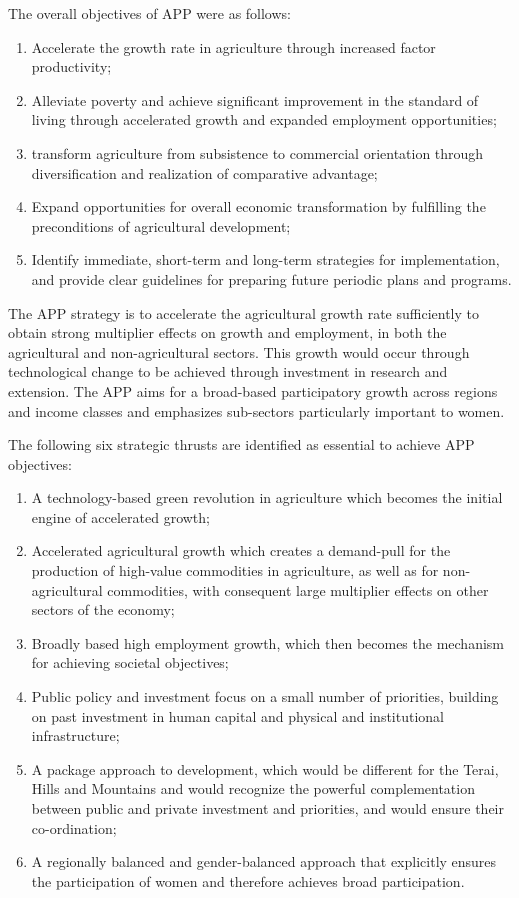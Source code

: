 \documentclass[
  openany]{book}
\providecommand{\tightlist}{%
  \setlength{\itemsep}{0pt}\setlength{\parskip}{0pt}}
\begin{document}
The overall objectives of APP were as follows:

\begin{enumerate}
\def\labelenumi{\arabic{enumi}.}
\item
  Accelerate the growth rate in agriculture through increased factor productivity;
\item
  Alleviate poverty and achieve significant improvement in the standard of living through accelerated growth and expanded employment opportunities;
\item
  transform agriculture from subsistence to commercial orientation through diversification and realization of comparative advantage;
\item
  Expand opportunities for overall economic transformation by fulfilling the preconditions of agricultural development;
\item
  Identify immediate, short-term and long-term strategies for implementation, and provide clear guidelines for preparing future periodic plans and programs.
\end{enumerate}

The APP strategy is to accelerate the agricultural growth rate sufficiently to obtain strong multiplier effects on growth and employment, in both the agricultural and non-agricultural sectors. This growth would occur through technological change to be achieved through investment in research and extension. The APP aims for a broad-based participatory growth across regions and income classes and emphasizes sub-sectors particularly important to women.

The following six strategic thrusts are identified as essential to achieve APP objectives:

\begin{enumerate}
\def\labelenumi{\arabic{enumi}.}
\tightlist
\item
  A technology-based green revolution in agriculture which becomes the initial engine of accelerated growth;
\item
  Accelerated agricultural growth which creates a demand-pull for the production of high-value commodities in agriculture, as well as for non-agricultural commodities, with consequent large multiplier effects on other sectors of the economy;
\item
  Broadly based high employment growth, which then becomes the mechanism for achieving societal objectives;
\item
  Public policy and investment focus on a small number of priorities, building on past investment in human capital and physical and institutional infrastructure;
\item
  A package approach to development, which would be different for the Terai, Hills and Mountains and would recognize the powerful complementation between public and private investment and priorities, and would ensure their co-ordination;
\item
  A regionally balanced and gender-balanced approach that explicitly ensures the participation of women and therefore achieves broad participation.
\end{enumerate}
\end{document}
